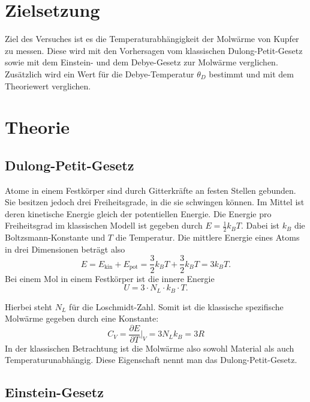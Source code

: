 \section{Zielsetzung}
\label{sec:Zielsetzung}

Ziel des Versuches ist es die Temperaturabhängigkeit der Molwärme von Kupfer zu messen. Diese wird mit den Vorhersagen 
vom klassischen Dulong-Petit-Gesetz sowie mit dem Einstein- und dem Debye-Gesetz zur Molwärme verglichen. Zusätzlich wird ein Wert für die Debye-Temperatur $\theta_D$ bestimmt und mit dem Theoriewert verglichen.


\section{Theorie}
\label{sec:Theorie}

\subsection{Dulong-Petit-Gesetz}
\label{sec:dulongpetit}

Atome in einem Festkörper sind durch Gitterkräfte an festen Stellen gebunden. Sie besitzen jedoch drei Freiheitsgrade, in die sie schwingen können. 
Im Mittel ist deren kinetische Energie gleich der potentiellen Energie. Die Energie pro Freiheitsgrad im klassischen Modell ist gegeben durch 
$E = \frac{1}{2}k_B T$. Dabei ist $k_B$ die Boltzsmann-Konstante und $T$ die Temperatur. Die mittlere Energie eines Atoms in drei Dimensionen beträgt also 
\begin{equation}
    E = E_{\text{kin}} + E_{\text{pot}} = \frac{3}{2}k_B T + \frac{3}{2}k_B T = 3k_B T.
\end{equation}
Bei einem Mol in einem Festkörper ist die innere Energie 
\begin{equation}
    U = 3 \cdot N_L\cdot k_B \cdot T.
\end{equation}

Hierbei steht $N_L$ für die Loschmidt-Zahl. Somit ist die klassische spezifische Molwärme gegeben durch eine Konstante:
\begin{equation}
    C_V = \frac{\partial E}{\partial T} \bigg\vert_V = 3 N_L k_B = 3 R
\end{equation}
In der klassischen Betrachtung ist die Molwärme also sowohl Material als auch Temperaturunabhängig. Diese Eigenschaft nennt man das Dulong-Petit-Gesetz.
\subsection{Einstein-Gesetz}
\label{sec:einstein}

